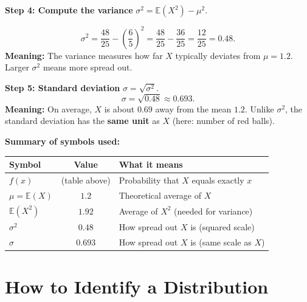 \documentclass{article}
\theoremstyle{remark}
\newenvironment{sub}{%
  \begin{list}{}{%
    \setlength{\leftmargin}{4em}%
    \setlength{\rightmargin}{0pt}%
    \setlength{\topsep}{0pt}%
    \setlength{\partopsep}{0pt}%
    \setlength{\parsep}{\parskip}%
    \setlength{\itemsep}{\parskip}%
  }\item\relax
}{\end{list}}
\newcommand{\E}{\mathbb{E}}
\begin{document}
\begin{sub}
\medskip
\textbf{Step 4: Compute the variance} $\sigma^2 = \E(X^2) - \mu^2$.

\[
  \sigma^2 = \frac{48}{25} - \left(\frac{6}{5}\right)^2
           = \frac{48}{25} - \frac{36}{25}
           = \frac{12}{25} = 0.48.
\]
\textbf{Meaning:} The variance measures how far $X$ typically deviates from
$\mu = 1.2$. Larger $\sigma^2$ means more spread out.

\medskip
\textbf{Step 5: Standard deviation} $\sigma = \sqrt{\sigma^2}$.
\[
  \sigma = \sqrt{0.48} \approx 0.693.
\]
\textbf{Meaning:} On average, $X$ is about $0.69$ away from the mean $1.2$.
Unlike $\sigma^2$, the standard deviation has the \textbf{same unit} as $X$
(here: number of red balls).

\medskip
\textbf{Summary of symbols used:}
\begin{center}
\begin{tabular}{lcl}
\toprule
\textbf{Symbol} & \textbf{Value} & \textbf{What it means} \\
\midrule
$f(x)$       & (table above) & Probability that $X$ equals exactly $x$ \\
$\mu = \E(X)$ & $1.2$        & Theoretical average of $X$ \\
$\E(X^2)$    & $1.92$        & Average of $X^2$ (needed for variance) \\
$\sigma^2$   & $0.48$        & How spread out $X$ is (squared scale) \\
$\sigma$     & $0.693$       & How spread out $X$ is (same scale as $X$) \\
\bottomrule
\end{tabular}
\end{center}

\end{sub}

\section{How to Identify a Distribution}
\label{sec:ov-identify}
\end{document}
